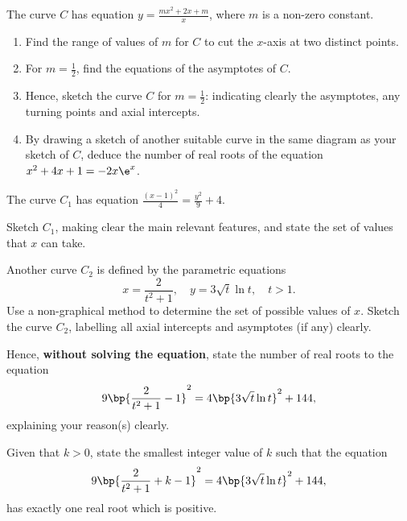 \begin{problem}
    The curve $C$ has equation $y=\frac{mx^{2}+2x+m}{x}$, where $m$ is a non-zero constant.

    \begin{enumerate}
        \item Find the range of values of $m$ for $C$ to cut the $x$-axis at two distinct points.
        \item For $m=\frac{1}{2}$, find the equations of the asymptotes of $C$.
        \item Hence, sketch the curve $C$ for $m=\frac{1}{2}$: indicating clearly the asymptotes, any turning points and axial intercepts.
        \item By drawing a sketch of another suitable curve in the same diagram as your sketch of $C$, deduce the number of real roots of the equation $x^{2}+4x+1=-2x \e^{x}$.
    \end{enumerate}
\end{problem}

\begin{problem}
    The curve $C_{1}$ has equation $\frac{(x-1)^{2}}{4}=\frac{y^{2}}{9}+4.$
    
    Sketch $C_{1}$, making clear the main relevant features, and state the set of values that $x$ can take.

    Another curve $C_{2}$ is defined by the parametric equations \[x=\dfrac{2}{t^{2}+1},\quad y=3\sqrt{t}\ln t, \quad t > 1.\] Use a non-graphical method to determine the set of possible values of $x$. Sketch the curve $C_{2}$, labelling all axial intercepts and asymptotes (if any) clearly. 
    
    Hence, \textbf{without solving the equation}, state the number of real roots to the equation \[9\bp{\frac{2}{t^{2}+1}-1}^{2}=4\bp{3\sqrt{t}\ln t}^{2}+144,\] explaining your reason(s) clearly.

    Given that $k>0$, state the smallest integer value of $k$ such that the equation \[9\bp{\frac{2}{t^{2}+1}+k-1}^{2}=4\bp{3\sqrt{t}\ln t}^{2}+144,\] has exactly one real root which is positive.
\end{problem}

